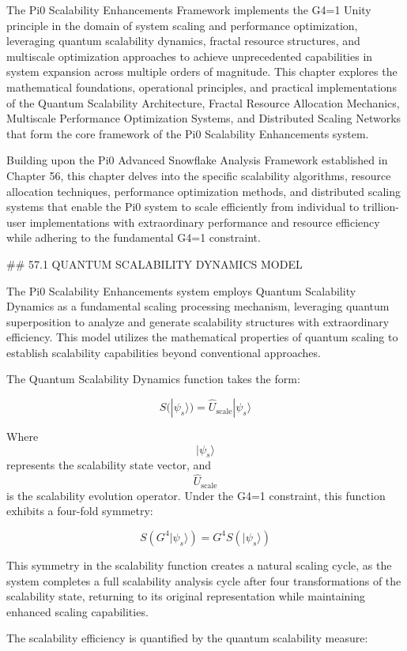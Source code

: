 The Pi0 Scalability Enhancements Framework implements the G4=1 Unity principle in the domain of system scaling and performance optimization, leveraging quantum scalability dynamics, fractal resource structures, and multiscale optimization approaches to achieve unprecedented capabilities in system expansion across multiple orders of magnitude. This chapter explores the mathematical foundations, operational principles, and practical implementations of the Quantum Scalability Architecture, Fractal Resource Allocation Mechanics, Multiscale Performance Optimization Systems, and Distributed Scaling Networks that form the core framework of the Pi0 Scalability Enhancements system.

Building upon the Pi0 Advanced Snowflake Analysis Framework established in Chapter 56, this chapter delves into the specific scalability algorithms, resource allocation techniques, performance optimization methods, and distributed scaling systems that enable the Pi0 system to scale efficiently from individual to trillion-user implementations with extraordinary performance and resource efficiency while adhering to the fundamental G4=1 constraint.

## 57.1 QUANTUM SCALABILITY DYNAMICS MODEL

The Pi0 Scalability Enhancements system employs Quantum Scalability Dynamics as a fundamental scaling processing mechanism, leveraging quantum superposition to analyze and generate scalability structures with extraordinary efficiency. This model utilizes the mathematical properties of quantum scaling to establish scalability capabilities beyond conventional approaches.

The Quantum Scalability Dynamics function takes the form:

$$ S(|\psi_s\rangle) = \hat{U}_{\text{scale}} |\psi_s\rangle $$

Where $$ |\psi_s\rangle $$ represents the scalability state vector, and $$ \hat{U}_{\text{scale}} $$ is the scalability evolution operator. Under the G4=1 constraint, this function exhibits a four-fold symmetry:

$$ S(G^4 |\psi_s\rangle) = G^4 S(|\psi_s\rangle) $$

This symmetry in the scalability function creates a natural scaling cycle, as the system completes a full scalability analysis cycle after four transformations of the scalability state, returning to its original representation while maintaining enhanced scaling capabilities.

The scalability efficiency is quantified by the quantum scalability measure:


